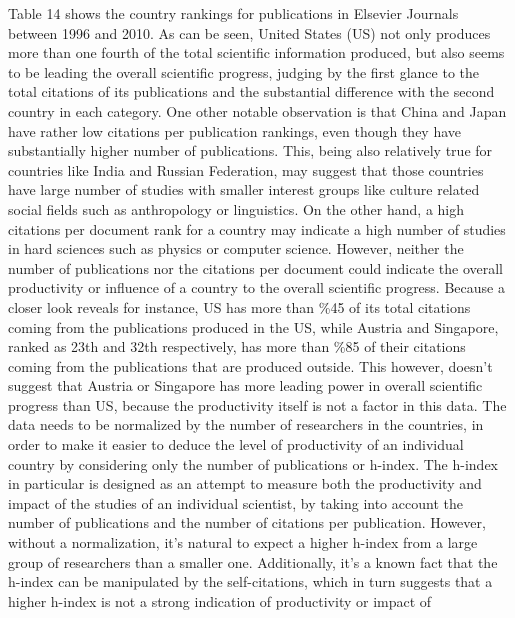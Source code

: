 \documentclass{article}
\begin{document}

\vspace{0.35cm}

Table 14 shows the country rankings for publications in Elsevier
Journals between 1996 and 2010. As can be seen, United States (US) not
only produces more than one fourth of the total scientific information
produced, but also seems to be leading the overall scientific
progress, judging by the first glance to the total citations of its
publications and the substantial difference with the second country in
each category. One other notable observation is that China and Japan
have rather low citations per publication rankings, even though they
have substantially higher number of publications. This, being also
relatively true for countries like India and Russian Federation, may
suggest that those countries have large number of studies with smaller
interest groups like culture related social fields such as
anthropology or linguistics. On the other hand, a high citations per
document rank for a country may indicate a high number of studies in
hard sciences such as physics or computer science. However, neither
the number of publications nor the citations per document could
indicate the overall productivity or influence of a country to the
overall scientific progress. Because a closer look reveals for
instance, US has more than \%45 of its total citations coming from the
publications produced in the US, while Austria and Singapore, ranked
as 23th and 32th respectively, has more than \%85 of their citations
coming from the publications that are produced outside. This however,
doesn't suggest that Austria or Singapore has more leading power in
overall scientific progress than US, because the productivity itself
is not a factor in this data. The data needs to be normalized by the
number of researchers in the countries, in order to make it easier to
deduce the level of productivity of an individual country by
considering only the number of publications or h-index. The h-index in
particular is designed as an attempt to measure both the productivity
and impact of the studies of an individual scientist, by taking into
account the number of publications and the number of citations per
publication. However, without a normalization, it's natural to expect
a higher h-index from a large group of researchers than a smaller
one. Additionally, it's a known fact that the h-index can be
manipulated by the self-citations, which in turn suggests that a
higher h-index is not a strong indication of productivity or impact of
\end{document}
